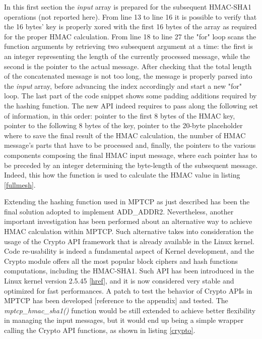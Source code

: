 In this first section the \textit{input} array is prepared for the subsequent HMAC-SHA1 operations (not reported here). From line 13 to line 16 it is possible to verify that the 16 bytes' key is properly xored with the first 16 bytes of the array as required for the proper HMAC calculation. From line 18 to line 27 the "for" loop scans the function arguments by retrieving two subsequent argument at a time: the first is an integer representing the length of the currently processed message, while the second is the pointer to the actual message. After checking that the total length of the concatenated message is not too long, the message is properly parsed into the \textit{input} array, before advancing the index accordingly and start a new "for" loop. The last part of the code snippet shows some padding additions required by the hashing function. The new API indeed requires to pass along the following set of information, in this order: pointer to the first 8 bytes of the HMAC key, pointer to the following 8 bytes of the key, pointer to the 20-byte placeholder where to save the final result of the HMAC calculation, the number of HMAC message's parts that have to be processed and, finally, the pointers to the various components composing the final HMAC input message, where each pointer has to be preceded by an integer determining the byte-length of the subsequent message. Indeed, this how the function is used to calculate the HMAC value in listing \ref{fullmesh}.


Extending the hashing function used in MPTCP as just described has been the final solution adopted to implement ADD\_ADDR2. Nevertheless, another important investigation has been performed about an alternative way to achieve HMAC calculation within MPTCP. Such alternative takes into consideration the usage of the Crypto API framework that is already available in the Linux kernel. Code re-usability is indeed a fundamental aspect of Kernel development, and the Crypto module offers all the most popular block ciphers and hash functions computations, including the HMAC-SHA1. Such API has been introduced in the Linux kernel version 2.5.45 [\href{http://lwn.net/Articles/13587/}{href}], and it is now considered very stable and optimized for fast performances. 
A patch to test the behavior of Crypto APIs in MPTCP has been developed [reference to the appendix] and tested. The \textit{mptcp\_hmac\_sha1()} function would be still extended to achieve better flexibility in managing the input messages, but it would end up being a simple wrapper calling the Crypto API functions, as shown in listing \ref{crypto}.

